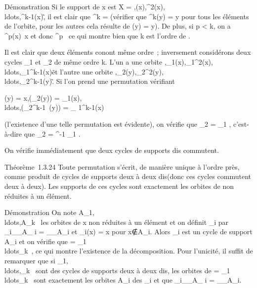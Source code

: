 \documentclass[]{article}
\begin{document}
Démonstration Si le support de x est X =
\x,\sigma(x),\sigma^2(x),
\\ldots,\sigma^k-1(x)\~,
il est clair que \sigma^k = \mathrmId (vérifier
que \sigma^k(y) = y pour tous les éléments de l'orbite, pour les
autres cela résulte de \sigma(y) = y). De plus, si p \textless{} k, on a
\sigma^p(x)\neq~x et donc
\sigma^p\neq~\mathrmId
ce qui montre bien que k est l'ordre de \sigma.

Il est clair que deux éléments con ont même ordre~; inversement
considérons deux cycles \sigma\_1 et \sigma\_2 de même ordre k.
L'un a une orbite
\x,\sigma\_1(x),\sigma\_1^2(x),
\\ldots,\sigma\_1^k-1(x)\~
et l'autre une orbite
\y,\sigma\_2(y),\sigma\_2^2(y),
\\ldots,\sigma\_2^k-1(y)\~.
Si l'on prend une permutation \tau vérifiant

\tau(y) = x,\tau(\sigma\_2(y)) =
\sigma\_1(x),\\ldots,\tau(\sigma\_2^k-1~(y))
= \sigma\_ 1^k-1(x)

(l'existence d'une telle permutation est évidente), on vérifie que \tau \cdot
\sigma\_2 = \sigma\_1 \cdot \tau, c'est-à-dire que \sigma\_2 =
\tau^-1 \cdot \sigma\_1 \cdot \tau.

On vérifie immédiatement que deux cycles de supports dis\jmathoints
commutent.

Théorème~1.3.24 Toute permutation \sigma s'écrit, de manière unique à l'ordre
près, comme produit de cycles de supports deux à deux dis\jmathoints (donc
ces cycles commutent deux à deux). Les supports de ces cycles sont
exactement les orbites de \sigma non réduites à un élément.

Démonstration On note
A\_1,\\ldots,A\_k~
les orbites de x non réduites à un élément et on définit \sigma\_i
par \sigma\_i\_\textbar{}\_A\_ i =
\sigma\_\textbar{}\_A\_i et \sigma\_i(x) = x pour
x∉A\_i. Alors \sigma\_i est un
cycle de support A\_i et on vérifie que \sigma =
\sigma\_1\\ldots\sigma\_k~,
ce qui montre l'existence de la décomposition. Pour l'unicité, il suffit
de remarquer que si
\sigma\_1,\\ldots,\sigma\_k~
sont des cycles de supports deux à deux dis\jmathoints, les orbites de \sigma =
\sigma\_1\\ldots\sigma\_k~
sont exactement les orbites A\_i des \sigma\_i et que
\sigma\_i\_\textbar{}\_A\_ i =
\sigma\_\textbar{}\_A\_i.
\end{document}
